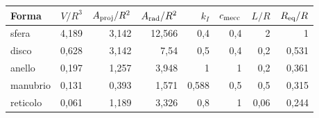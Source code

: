 \begin{tabular}{@{}lrrrrrrr@{}}
\hline
Forma & $V/R^3$ & $A_{\rm proj}/R^2$ & $A_{\rm rad}/R^2$ & $k_I$ & $c_{\rm mecc}$ & $L/R$ & $R_{\rm eq}/R$ \\
\hline
sfera & 4{,}189 & 3{,}142 & 12{,}566 & 0{,}4 & 0{,}4 & 2 & 1 \\
disco & 0{,}628 & 3{,}142 & 7{,}54 & 0{,}5 & 0{,}4 & 0{,}2 & 0{,}531 \\
anello & 0{,}197 & 1{,}257 & 3{,}948 & 1 & 1 & 0{,}2 & 0{,}361 \\
manubrio & 0{,}131 & 0{,}393 & 1{,}571 & 0{,}588 & 0{,}5 & 0{,}5 & 0{,}315 \\
reticolo & 0{,}061 & 1{,}189 & 3{,}326 & 0{,}8 & 1 & 0{,}06 & 0{,}244 \\
\hline
\end{tabular}
